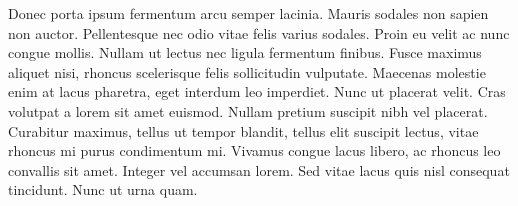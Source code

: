 \documentclass[parskip=full]{scrreprt}
\begin{document}
Donec porta ipsum fermentum arcu semper lacinia. Mauris sodales non sapien non auctor. Pellentesque nec odio vitae felis varius sodales. Proin eu velit ac nunc congue mollis. Nullam ut lectus nec ligula fermentum finibus. Fusce maximus aliquet nisi, rhoncus scelerisque felis sollicitudin vulputate. Maecenas molestie enim at lacus pharetra, eget interdum leo imperdiet. Nunc ut placerat velit. Cras volutpat a lorem sit amet euismod. Nullam pretium suscipit nibh vel placerat. Curabitur maximus, tellus ut tempor blandit, tellus elit suscipit lectus, vitae rhoncus mi purus condimentum mi. Vivamus congue lacus libero, ac rhoncus leo convallis sit amet. Integer vel accumsan lorem. Sed vitae lacus quis nisl consequat tincidunt. Nunc ut urna quam. 

\nocite{*}


\end{document}
